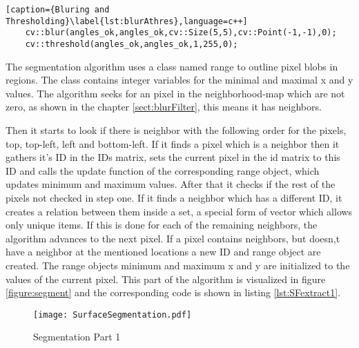 \begin{lstlisting}[caption={Bluring and Thresholding}\label{lst:blurAthres},language=c++]
	cv::blur(angles_ok,angles_ok,cv::Size(5,5),cv::Point(-1,-1),0);
	cv::threshold(angles_ok,angles_ok,1,255,0);
\end{lstlisting}

The segmentation algorithm uses a class named range to outline pixel blobs in regions. The class contains integer 
variables for the minimal and maximal x and y values. The algorithm seeks for an pixel in the 
neighborhood-map which are not zero, as shown in the chapter \vref{sect:blurFilter}, this means it has neighbors. 

Then it starts to look if there is neighbor with the following order for the pixels, top, top-left, left and bottom-left.
If it finds a pixel which is a neighbor then it gathers it's ID in the IDs matrix, sets the current pixel in the
id matrix to this ID and calls the update function of the corresponding range object, which updates minimum and
maximum values. After that it checks if the rest of the pixels not checked in step one. If it finds a neighbor
which has a different ID, it creates a relation between them inside a set, a special form of vector which allows
only unique items. If this is done for each of the remaining neighbors, the algorithm advances to the next pixel. 
If a pixel contains neighbors, but doesn,t have a neighbor at the mentioned locations a new ID and range object are 
created. The range objects minimum and maximum x and y are initialized to the values of the current pixel.
This part of the algorithm is visualized in figure \vref{figure:segment} and the corresponding code is shown in listing
\vref{lst:SFextract1}.

\begin{figure}[htp]
\begin{center}
  \texttt{[image: SurfaceSegmentation.pdf]}
  \caption{Segmentation Part 1}
  \label{figure:segment}
\end{center}
\end{figure}

